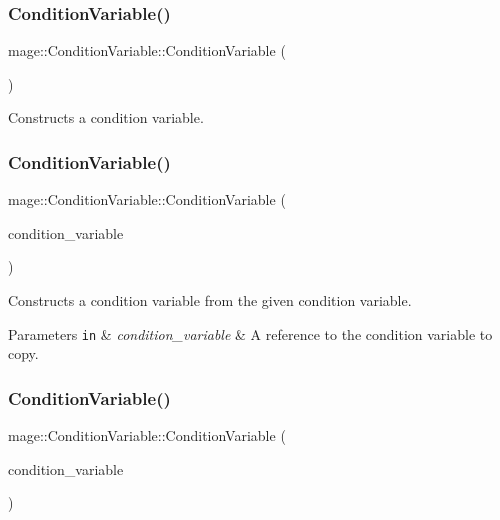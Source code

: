 \subsubsection{\texorpdfstring{Condition\+Variable()}{ConditionVariable()}\hspace{0.1cm}{\footnotesize\ttfamily [1/3]}}
{\footnotesize\ttfamily mage\+::\+Condition\+Variable\+::\+Condition\+Variable (\begin{DoxyParamCaption}{ }\end{DoxyParamCaption})}

Constructs a condition variable. \hypertarget{structmage_1_1_condition_variable_add5ccf5807a94588c28621141df334d3}{}\label{structmage_1_1_condition_variable_add5ccf5807a94588c28621141df334d3} 
\subsubsection{\texorpdfstring{Condition\+Variable()}{ConditionVariable()}\hspace{0.1cm}{\footnotesize\ttfamily [2/3]}}
{\footnotesize\ttfamily mage\+::\+Condition\+Variable\+::\+Condition\+Variable (\begin{DoxyParamCaption}\item[{const \hyperlink{structmage_1_1_condition_variable}{Condition\+Variable} \&}]{condition\+\_\+variable }\end{DoxyParamCaption})\hspace{0.3cm}{\ttfamily [delete]}}

Constructs a condition variable from the given condition variable.


\begin{DoxyParams}[1]{Parameters}
\mbox{\tt in}  & {\em condition\+\_\+variable} & A reference to the condition variable to copy. \\
\hline
\end{DoxyParams}
\hypertarget{structmage_1_1_condition_variable_a16507f71180938eb82af7e35d3ca5df7}{}\label{structmage_1_1_condition_variable_a16507f71180938eb82af7e35d3ca5df7} 
\subsubsection{\texorpdfstring{Condition\+Variable()}{ConditionVariable()}\hspace{0.1cm}{\footnotesize\ttfamily [3/3]}}
{\footnotesize\ttfamily mage\+::\+Condition\+Variable\+::\+Condition\+Variable (\begin{DoxyParamCaption}\item[{\hyperlink{structmage_1_1_condition_variable}{Condition\+Variable} \&\&}]{condition\+\_\+variable }\end{DoxyParamCaption})\hspace{0.3cm}{\ttfamily [default]}}

